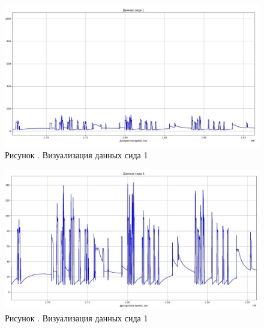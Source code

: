      \begin{figure}
  	\centering
  	\def\svgwidth{\textwidth}
  	\includegraphics[scale=0.8]{images/data_1_visual_3.jpg}
  	\caption*{\gostFont Рисунок \thechaptercntr .\theimagecntr \spc {--} Визуализация данных сида 1}
  	\label{fig:MLADBlackBox}
  \end{figure} \addtocounter{imagecntr}{1}
  
     \begin{figure}
  	\centering
  	\def\svgwidth{\textwidth}
  	\includegraphics[scale=0.8]{images/data_1_visual_4.jpg}
  	\caption*{\gostFont Рисунок \thechaptercntr .\theimagecntr \spc {--} Визуализация данных сида 1}
  	\label{fig:MLADBlackBox}
  \end{figure} \addtocounter{imagecntr}{1}
  
